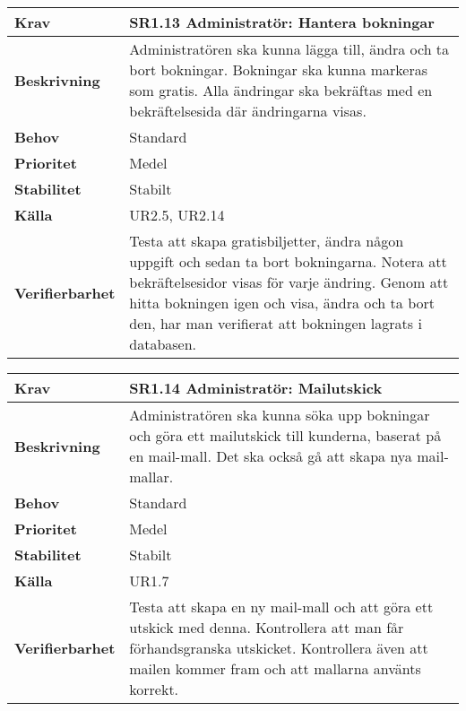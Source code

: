 \documentclass[a4paper, twoside, 11pt, titlepage]{article}
\begin{document}
			\begin {table} [ht] \begin{tabular} { p{2.6cm} p{12.5cm} }
				\hline
				\sffamily\textbf{Krav} & \sffamily\textbf{SR1.13 Administratör: Hantera bokningar } \\
				\hline
				\sffamily\textbf{Beskrivning} & Administratören ska kunna lägga till, ändra och ta bort bokningar. Bokningar ska kunna markeras som gratis. Alla ändringar ska bekräftas med en bekräftelsesida där ändringarna visas.  \\
				\hline
				\sffamily\textbf{Behov} & Standard  \\
				\hline
				\sffamily\textbf{Prioritet} & Medel  \\
				\hline
				\sffamily\textbf{Stabilitet} & Stabilt  \\
				\hline
				\sffamily\textbf{Källa} & UR2.5, UR2.14  \\
				\hline
				\sffamily\textbf{Verifierbarhet} & Testa att skapa gratisbiljetter, ändra någon uppgift och sedan ta bort bokningarna. Notera att bekräftelsesidor visas för varje ändring. Genom att hitta bokningen igen och visa, ändra och ta bort den, har man verifierat att bokningen lagrats i databasen.  \\
				\hline
			\end{tabular} \end{table} \FloatBarrier
			\vspace{6mm}

			\begin {table} [ht] \begin{tabular} { p{2.6cm} p{12.5cm} }
				\hline
				\sffamily\textbf{Krav} & \sffamily\textbf{SR1.14 Administratör: Mailutskick } \\
				\hline
				\sffamily\textbf{Beskrivning} & Administratören ska kunna söka upp bokningar och göra ett mailutskick till kunderna, baserat på en mail-mall. Det ska också gå att skapa nya mail-mallar.  \\
				\hline
				\sffamily\textbf{Behov} & Standard  \\
				\hline
				\sffamily\textbf{Prioritet} & Medel  \\
				\hline
				\sffamily\textbf{Stabilitet} & Stabilt  \\
				\hline
				\sffamily\textbf{Källa} & UR1.7  \\
				\hline
				\sffamily\textbf{Verifierbarhet} & Testa att skapa en ny mail-mall och att göra ett utskick med denna. Kontrollera att man får förhandsgranska utskicket. Kontrollera även att mailen kommer fram och att mallarna använts korrekt.  \\
				\hline
			\end{tabular} \end{table} \FloatBarrier
			\vspace{6mm}
\end{document}
